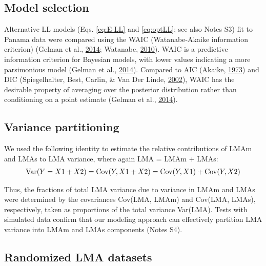 \documentclass[12pt,]{article}
\theoremstyle{definition}
\theoremstyle{definition}
\theoremstyle{definition}
\theoremstyle{remark}
\begin{document}
\hypertarget{model-selection}{%
\subsection{Model selection}\label{model-selection}}

Alternative LL models (Eqs. \eqref{eq:E-LL} and \eqref{eq:optLL}; see also
Notes S3) fit to Panama data were compared using the WAIC
(Watanabe-Akaike information criterion) (Gelman et al.,
\protect\hyperlink{ref-Gelman2014}{2014}; Watanabe,
\protect\hyperlink{ref-Watanabe2010}{2010}). WAIC is a predictive
information criterion for Bayesian models, with lower values indicating
a more parsimonious model (Gelman et al.,
\protect\hyperlink{ref-Gelman2014}{2014}). Compared to AIC (Akaike,
\protect\hyperlink{ref-Akaike1973}{1973}) and DIC (Spiegelhalter, Best,
Carlin, \& Van Der Linde,
\protect\hyperlink{ref-Spiegelhalter2002}{2002}), WAIC has the desirable
property of averaging over the posterior distribution rather than
conditioning on a point estimate (Gelman et al.,
\protect\hyperlink{ref-Gelman2014}{2014}).

\hypertarget{variance-partitioning}{%
\subsection{Variance partitioning}\label{variance-partitioning}}

We used the following identity to estimate the relative contributions of
LMAm and LMAs to LMA variance, where again LMA = LMAm + LMAs:
\begin{align}
  {\rm Var}(Y = X1 + X2) = {\rm Cov}(Y, X1+X2) =
  {\rm Cov}(Y,X1) + {\rm Cov}(Y,X2)
  \label{eq:var}
\end{align}

Thus, the fractions of total LMA variance due to variance in LMAm and
LMAs were determined by the covariances Cov(LMA, LMAm) and Cov(LMA,
LMAs), respectively, taken as proportions of the total variance
Var(LMA). Tests with simulated data confirm that our modeling approach
can effectively partition LMA variance into LMAm and LMAs components
(Notes S4).

\hypertarget{randomized-lma-datasets}{%
\subsection{Randomized LMA datasets}\label{randomized-lma-datasets}}
\end{document}
